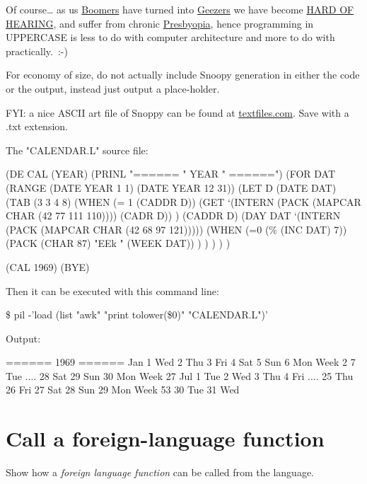 Of course\ldots{} as us
\href{http://en.wikipedia.org/wiki/Baby-Boom\_Generation}{Boomers} have
turned into \href{http://en.wikipedia.org/wiki/Geezer}{Geezers} we have
become \href{http://en.wikipedia.org/wiki/All\_caps\#Computing}{HARD OF
HEARING}, and suffer from chronic
\href{http://en.wikipedia.org/wiki/Presbyopia}{Presbyopia}, hence
programming in UPPERCASE is less to do with computer architecture and
more to do with practically.~:-)

For economy of size, do not actually include Snoopy generation in either
the code or the output, instead just output a place-holder.

FYI: a nice ASCII art file of Snoppy can be found at
\href{http://www.textfiles.com/artscene/asciiart/cursepic.art}{textfiles.com}.
Save with a .txt extension.


\begin{wideverbatim}

The "CALENDAR.L" source file:

(DE CAL (YEAR)
   (PRINL "====== " YEAR " ======")
   (FOR DAT (RANGE (DATE YEAR 1 1) (DATE YEAR 12 31))
      (LET D (DATE DAT)
         (TAB (3 3 4 8)
            (WHEN (= 1 (CADDR D))
               (GET `(INTERN (PACK (MAPCAR CHAR (42 77 111 110)))) (CADR D)) )
            (CADDR D)
            (DAY DAT `(INTERN (PACK (MAPCAR CHAR (42 68 97 121)))))
            (WHEN (=0 (\% (INC DAT) 7))
               (PACK (CHAR 87) "EEk " (WEEK DAT)) ) ) ) ) )

(CAL 1969)
(BYE)

Then it can be executed with this command line:

\$ pil -'load (list "awk" "{print tolower(\$0)}" "CALENDAR.L")'

Output:

====== 1969 ======
Jan  1 Wed
     2 Thu
     3 Fri
     4 Sat
     5 Sun
     6 Mon  Week 2
     7 Tue
....
    28 Sat
    29 Sun
    30 Mon Week 27
Jul  1 Tue
     2 Wed
     3 Thu
     4 Fri
....
    25 Thu
    26 Fri
    27 Sat
    28 Sun
    29 Mon Week 53
    30 Tue
    31 Wed

\end{wideverbatim}

\pagebreak{}
\section*{Call a foreign-language function}

Show how a \emph{foreign language function} can be called from the
language.

